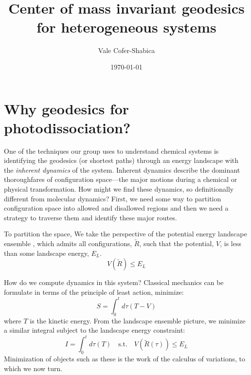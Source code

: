 \documentclass[letter,11pt]{article}
\title{Center of mass invariant geodesics for heterogeneous systems}
\author{Vale Cofer-Shabica}
\date{\today}
\newcommand{\cvec}[1]{\utilde{#1}}
\newcommand{\laeq}[1]{\label{eqn:#1}}
\begin{document}
\maketitle


\section{Why geodesics for photodissociation?}
One of the techniques our group uses to understand chemical systems is identifying the geodesics (or shortest paths) through an energy landscape with the \emph{inherent dynamics} of the system. Inherent dynamics describe the dominant thoroughfares of configuration space---the major motions during a chemical or physical transformation. How might we find these dynamics, so definitionally different from molecular dynamics? First, we need some way to partition configuration space into allowed and disallowed regions and then we need a strategy to traverse them and identify these major routes.

To partition the space, We take the perspective of the potential energy landscape ensemble \cite{wang:2007:pele}, which admits all configurations, $\cvec{R}$, such that the potential, $V$, is less than some landscape energy, $E_L$.
\[
  V(\cvec{R}) \le E_L
\]

How do we compute dynamics in this system? Classical mechanics can be formulate in terms of the principle of least action, minimize:
\[
  S = \int_{0}^{t}d\tau\left( T - V \right)
\]
where $T$ is the kinetic energy. From the landscape ensemble picture, we minimize a similar integral subject to the landscape energy constraint:
\begin{equation} \laeq{peleS}
  I = \int_{0}^{t}d\tau\left( T \right) \quad \textrm{s.t.} \quad   V(\cvec{R}(\tau)) \le E_L
\end{equation}
Minimization of objects such as these is the work of the calculus of variations, to which we now turn.
\end{document}
